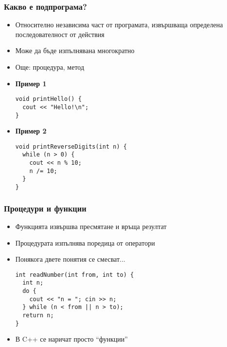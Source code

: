 \documentclass{beamer}
\begin{document}
\begin{frame}[fragile]
  \frametitle{Какво е подпрограма?}

  \begin{itemize}[<+->]
  \item Относително независима част от програмата, извършваща определена последователност от действия
  \item Може да бъде изпълнявана многократно
  \item Още: процедура, метод
  \item \textbf{Пример 1}
\begin{lstlisting}
void printHello() {
  cout << "Hello!\n";
}
\end{lstlisting}
  \item \textbf{Пример 2}
\begin{lstlisting}
void printReverseDigits(int n) {
  while (n > 0) {
    cout << n % 10;
    n /= 10;
  }
}
\end{lstlisting}
  \end{itemize}
\end{frame}

\begin{frame}[fragile]
  \frametitle{Процедури и функции}

  \begin{itemize}[<+->]
  \item Функцията извършва пресмятане и връща резултат
  \item Процедурата изпълнява поредица от оператори
  \item Понякога двете понятия се смесват...
\begin{lstlisting}
int readNumber(int from, int to) {
  int n;
  do {
    cout << "n = "; cin >> n;
  } while (n < from || n > to);
  return n;
}
\end{lstlisting}
  \item В C++ се наричат просто ``функции''
  \end{itemize}
\end{frame}
\end{document}
